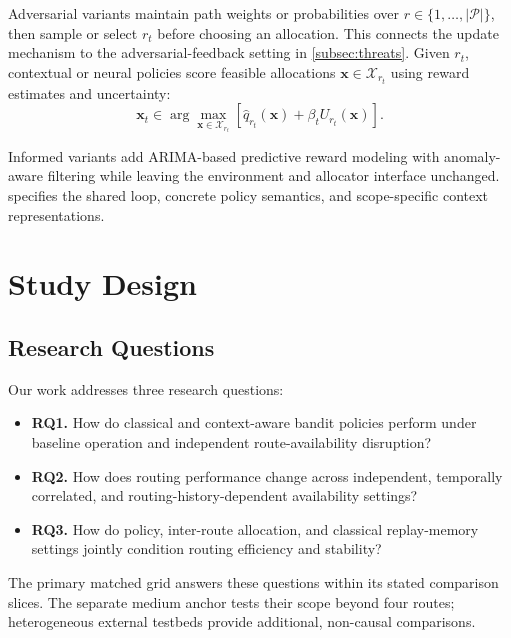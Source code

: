 \documentclass[10pt,journal]{IEEEtran}
\begin{document}
Adversarial variants maintain path weights or probabilities over $r\in\{1,\ldots,|\mathcal{P}|\}$, then sample or select $r_t$ before choosing an allocation. This connects the update mechanism to the adversarial-feedback setting in \cref{subsec:threats}. Given $r_t$, contextual or neural policies score feasible allocations $\mathbf{x}\in\mathcal{X}_{r_t}$ using reward estimates and uncertainty:
\[
\mathbf{x}_t \in \arg\max_{\mathbf{x}\in\mathcal{X}_{r_t}}
\left[\widehat{q}_{r_t}(\mathbf{x})+\beta_t U_{r_t}(\mathbf{x})\right].
\]

Informed variants add ARIMA-based predictive reward modeling with anomaly-aware filtering while leaving the environment and allocator interface unchanged.  specifies the shared loop, concrete policy semantics, and scope-specific context representations.

\section{Study Design}
\label{sec:studydesign}

\subsection{Research Questions}
\label{sec:research_questions}

\noindent Our work addresses three research questions:
\begin{itemize}
    \item \textbf{RQ1.} How do classical and context-aware bandit policies perform under baseline operation and independent route-availability disruption?
    \item \textbf{RQ2.} How does routing performance change across independent, temporally correlated, and routing-history-dependent availability settings?
    \item \textbf{RQ3.} How do policy, inter-route allocation, and classical replay-memory settings jointly condition routing efficiency and stability?
\end{itemize}
The primary matched grid answers these questions within its stated comparison slices. The separate medium anchor tests their scope beyond four routes; heterogeneous external testbeds provide additional, non-causal comparisons.
\end{document}
